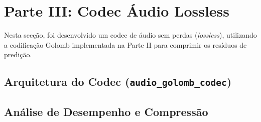 \documentclass[a4paper, 11pt, portuguese]{article}
\begin{document}


\section{Parte III: Codec Áudio Lossless}

Nesta secção, foi desenvolvido um codec de áudio sem perdas (\textit{lossless}), utilizando a codificação Golomb implementada na Parte II para comprimir os resíduos de predição.

\subsection{Arquitetura do Codec (\texttt{audio\_golomb\_codec})}


\subsection{Análise de Desempenho e Compressão}

\end{document}
